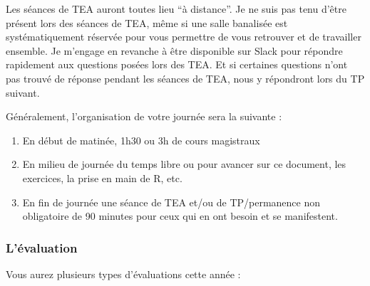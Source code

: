 \documentclass[
  a4paper,
]{article}
\providecommand{\tightlist}{%
  \setlength{\itemsep}{0pt}\setlength{\parskip}{0pt}}
\begin{document}
Les séances de TEA auront toutes lieu ``à distance''. Je ne suis pas tenu d'être présent lors des séances de TEA, même si une salle banalisée est systématiquement réservée pour vous permettre de vous retrouver et de travailler ensemble. Je m'engage en revanche à être disponible sur Slack pour répondre rapidement aux questions posées lors des TEA. Et si certaines questions n'ont pas trouvé de réponse pendant les séances de TEA, nous y répondront lors du TP suivant.

Généralement, l'organisation de votre journée sera la suivante :

\begin{enumerate}
\def\labelenumi{\arabic{enumi}.}
\tightlist
\item
  En début de matinée, 1h30 ou 3h de cours magistraux
\item
  En milieu de journée du temps libre ou pour avancer sur ce document, les exercices, la prise en main de R, etc.
\item
  En fin de journée une séance de TEA et/ou de TP/permanence non obligatoire de 90 minutes pour ceux qui en ont besoin et se manifestent.
\end{enumerate}

\hypertarget{luxe9valuation}{%
\subsubsection{L'évaluation}\label{luxe9valuation}}

Vous aurez plusieurs types d'évaluations cette année :
\end{document}
